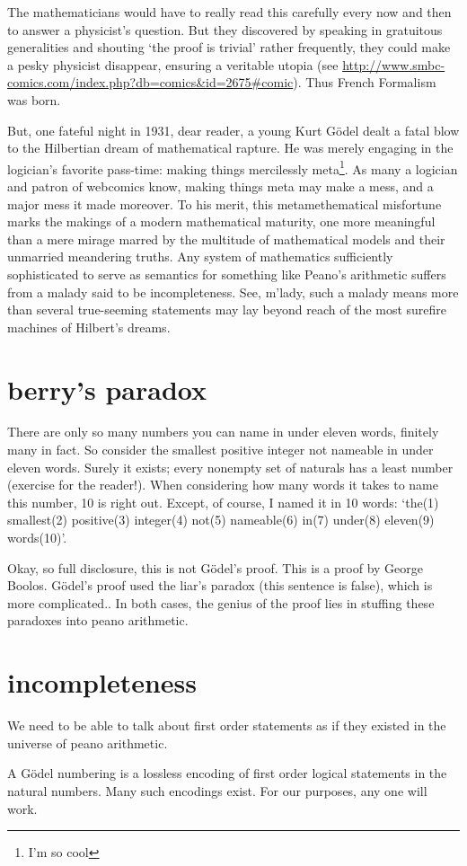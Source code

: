 \documentclass{scrbook}
\begin{document}
The mathematicians would have to really read this carefully every now and then to answer a physicist's question. But they discovered by speaking in gratuitous generalities and shouting `the proof is trivial' rather frequently, they could make a pesky physicist disappear, ensuring a veritable utopia (see \url{http://www.smbc-comics.com/index.php?db=comics&id=2675#comic}). Thus French Formalism was born.  

But, one fateful night in 1931, dear reader, a young Kurt Gödel dealt a fatal blow to the Hilbertian dream of mathematical rapture. He was merely engaging in the logician's favorite pass-time: making things mercilessly meta\footnote{I'm so cool}. As many a logician and patron of webcomics know, making things meta may make a mess, and a major mess it made moreover. To his merit, this metamethematical misfortune marks the makings of a modern mathematical maturity, one more meaningful than a mere mirage marred by the multitude of mathematical models and their unmarried meandering truths. Any system of mathematics sufficiently sophisticated to serve as semantics for something like Peano's arithmetic suffers from a malady said to be incompleteness. See, m'lady, such a malady means more than several true-seeming statements may lay beyond reach of the most surefire machines of Hilbert's dreams.

\section{berry's paradox}
There are only so many numbers you can name in under eleven words, finitely many in fact. So consider the smallest positive integer not nameable in under eleven words. Surely it exists; every nonempty set of naturals has a least number (exercise for the reader!). When considering how many words it takes to name this number, 10 is right out. Except, of course, I named it in 10 words: `the(1) smallest(2) positive(3) integer(4) not(5) nameable(6) in(7) under(8) eleven(9) words(10)'.  

Okay, so full disclosure, this is not Gödel's proof. This is a proof by George Boolos. Gödel's proof used the liar's paradox (this sentence is false), which is more complicated.\cite{wiki:incomplete-sketch}. In both cases, the genius of the proof lies in stuffing these paradoxes into peano arithmetic.  

\section{incompleteness} 
We need to be able to talk about first order statements as if they existed in the universe of peano arithmetic.  
\begin{defn}
  A Gödel numbering is a lossless encoding of first order logical statements in the natural numbers. Many such encodings exist. For our purposes, any one will work. 
\end{defn}
\end{document}
